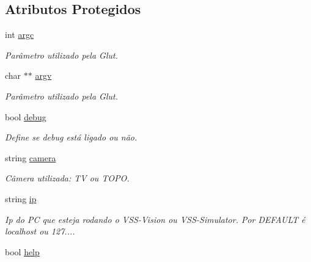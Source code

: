 \subsection*{Atributos Protegidos}
\begin{DoxyCompactItemize}
\item 
int \hyperlink{classGraphics_a1b1e8eba7ed4e60d78d785e70765fef6}{argc}\hypertarget{classGraphics_a1b1e8eba7ed4e60d78d785e70765fef6}{}\label{classGraphics_a1b1e8eba7ed4e60d78d785e70765fef6}

\begin{DoxyCompactList}\small\item\em Parâmetro utilizado pela Glut. \end{DoxyCompactList}\item 
char $\ast$$\ast$ \hyperlink{classGraphics_aca7bf0128e62af000265c0e66ed5e7e1}{argv}\hypertarget{classGraphics_aca7bf0128e62af000265c0e66ed5e7e1}{}\label{classGraphics_aca7bf0128e62af000265c0e66ed5e7e1}

\begin{DoxyCompactList}\small\item\em Parâmetro utilizado pela Glut. \end{DoxyCompactList}\item 
bool \hyperlink{classGraphics_a16b588a2b580e104d18c347f8318e3bd}{debug}\hypertarget{classGraphics_a16b588a2b580e104d18c347f8318e3bd}{}\label{classGraphics_a16b588a2b580e104d18c347f8318e3bd}

\begin{DoxyCompactList}\small\item\em Define se debug está ligado ou não. \end{DoxyCompactList}\item 
string \hyperlink{classGraphics_acb397e43edd9c7d6de193bbb9ff55b94}{camera}\hypertarget{classGraphics_acb397e43edd9c7d6de193bbb9ff55b94}{}\label{classGraphics_acb397e43edd9c7d6de193bbb9ff55b94}

\begin{DoxyCompactList}\small\item\em Câmera utilizada\+: TV ou T\+O\+PO. \end{DoxyCompactList}\item 
string \hyperlink{classGraphics_ad5daf3bff501ac78b1507a8df1534423}{ip}\hypertarget{classGraphics_ad5daf3bff501ac78b1507a8df1534423}{}\label{classGraphics_ad5daf3bff501ac78b1507a8df1534423}

\begin{DoxyCompactList}\small\item\em Ip do PC que esteja rodando o V\+S\+S-\/\+Vision ou V\+S\+S-\/\+Simulator. Por D\+E\+F\+A\+U\+LT é localhost ou 127.... \end{DoxyCompactList}\item 
bool \hyperlink{classGraphics_ade66c8f921643170d6e576987361ae31}{help}\hypertarget{classGraphics_ade66c8f921643170d6e576987361ae31}{}\label{classGraphics_ade66c8f921643170d6e576987361ae31}


\end{DoxyCompactItemize}
